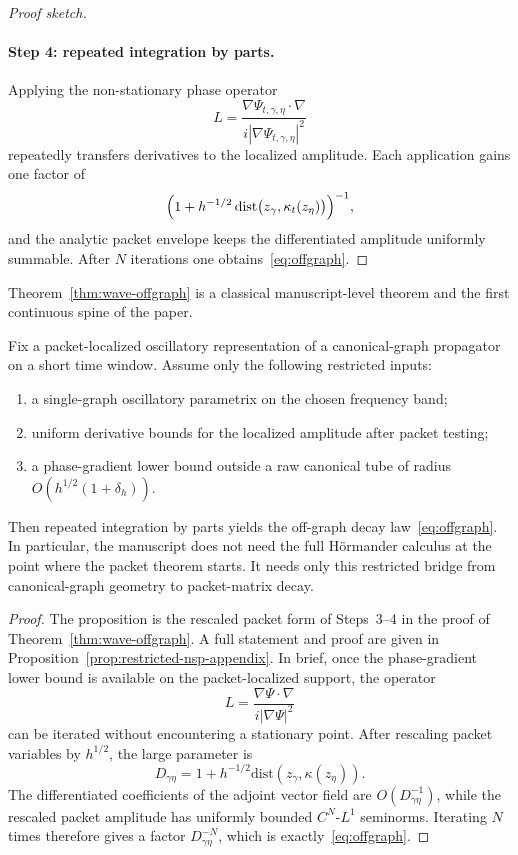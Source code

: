 \begin{proof}[Proof sketch]
\paragraph{Step 4: repeated integration by parts.}
Applying the non-stationary phase operator
\[
L
=
\frac{\nabla\Psi_{t,\gamma,\eta}\cdot\nabla}{i|\nabla\Psi_{t,\gamma,\eta}|^2}
\]
repeatedly transfers derivatives to the localized amplitude. Each application gains one factor of
\[
\Bigl(1+h^{-1/2}\,\mathrm{dist}\bigl(z_\gamma,\kappa_t(z_\eta)\bigr)\Bigr)^{-1},
\]
and the analytic packet envelope keeps the differentiated amplitude uniformly summable. After $N$ iterations one obtains~\eqref{eq:offgraph}.
\end{proof}

Theorem~\ref{thm:wave-offgraph} is a classical manuscript-level theorem and the first continuous spine of the paper.

\begin{proposition}
\label{prop:restricted-nsp-bridge}
Fix a packet-localized oscillatory representation of a canonical-graph propagator on a short time window. Assume only the following restricted inputs:
\begin{enumerate}
\item a single-graph oscillatory parametrix on the chosen frequency band;
\item uniform derivative bounds for the localized amplitude after packet testing;
\item a phase-gradient lower bound outside a raw canonical tube of radius $O(h^{1/2}(1+\delta_h))$.
\end{enumerate}
Then repeated integration by parts yields the off-graph decay law~\eqref{eq:offgraph}. In particular, the manuscript does not need the full H\"ormander calculus at the point where the packet theorem starts. It needs only this restricted bridge from canonical-graph geometry to packet-matrix decay.
\end{proposition}

\begin{proof}
The proposition is the rescaled packet form of Steps~3--4 in the proof of Theorem~\ref{thm:wave-offgraph}.  A full statement and proof are given in Proposition~\ref{prop:restricted-nsp-appendix}.  In brief, once the phase-gradient lower bound is available on the packet-localized support, the operator
\[
L=\frac{\nabla\Psi\cdot\nabla}{i|\nabla\Psi|^2}
\]
can be iterated without encountering a stationary point.  After rescaling packet variables by $h^{1/2}$, the large parameter is
\[
D_{\gamma\eta}=1+h^{-1/2}\mathrm{dist}(z_\gamma,\kappa(z_\eta)).
\]
The differentiated coefficients of the adjoint vector field are $O(D_{\gamma\eta}^{-1})$, while the rescaled packet amplitude has uniformly bounded $C^N$-$L^1$ seminorms.  Iterating $N$ times therefore gives a factor $D_{\gamma\eta}^{-N}$, which is exactly~\eqref{eq:offgraph}.
\end{proof}

